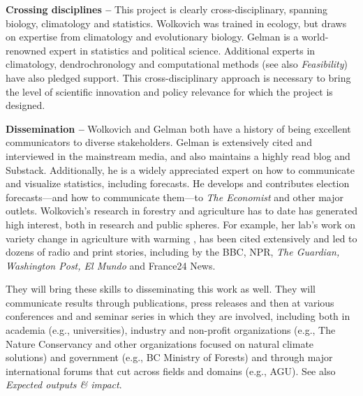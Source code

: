 \documentclass[11pt]{article}
\begin{document}
{\bf Crossing disciplines --} %
This project is clearly cross-disciplinary, spanning biology, climatology and statistics. Wolkovich was trained in ecology, but draws on expertise from climatology and evolutionary biology. Gelman is a world-renowned expert in statistics and political science. Additional experts in climatology, dendrochronology and computational methods (see also \emph{Feasibility}) have also pledged support. This cross-disciplinary approach is necessary to bring the level of scientific innovation and policy relevance for which the project is designed. 

{\bf Dissemination -- }%
Wolkovich and Gelman both have a history of being excellent communicators to diverse stakeholders. Gelman is extensively cited and interviewed in the mainstream media, and also maintains a highly read blog and Substack. Additionally, he is a widely appreciated expert on how to communicate and visualize statistics, including forecasts. He develops and contributes election forecasts---and how to communicate them---to \emph{The Economist} and other major outlets. Wolkovich's research in forestry and agriculture has to date has generated high interest, both in research and public spheres. For example, her lab's work on variety change in agriculture with warming \cite{moralescastilla}, has been cited extensively and led to dozens of radio and print stories, including by the BBC, NPR, \emph{The Guardian, Washington Post, El Mundo} and France24 News. 

They will bring these skills to disseminating this work as well. They will communicate results through publications, press releases and then at various conferences and and seminar series in which they are involved, including both in academia (e.g., universities), industry and non-profit organizations (e.g., The Nature Conservancy and other organizations focused on natural climate solutions) and government (e.g., BC Ministry of Forests) and through major international forums that cut across fields and domains (e.g., AGU). See also \emph{Expected outputs \& impact}.
\end{document}
